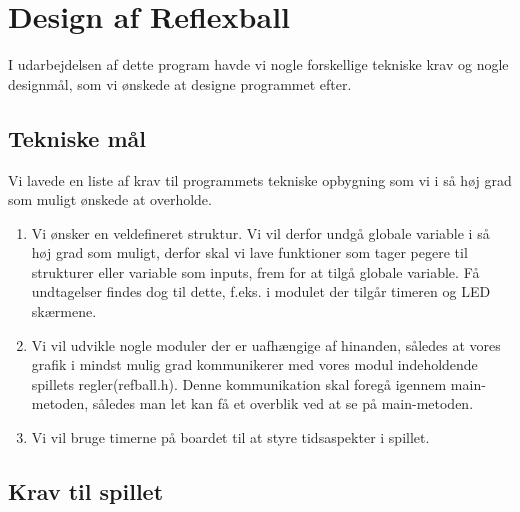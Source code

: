 \section{Design af Reflexball}
I udarbejdelsen af dette program havde vi nogle forskellige tekniske krav og nogle designmål, som vi ønskede at designe programmet efter.
\subsection{Tekniske mål}
Vi lavede en liste af krav til programmets tekniske opbygning som vi i så høj grad som muligt ønskede at overholde. 
\begin{enumerate}
\item Vi ønsker en veldefineret struktur. Vi vil derfor undgå globale variable i så høj grad som muligt, derfor skal vi lave funktioner som tager pegere til strukturer eller variable som inputs, frem for at tilgå globale variable. Få undtagelser findes dog til dette, f.eks. i modulet der tilgår timeren og LED skærmene.
\item Vi vil udvikle nogle moduler  der er uafhængige af hinanden, således at vores grafik i mindst mulig grad kommunikerer med vores modul indeholdende spillets regler(refball.h). Denne kommunikation skal foregå igennem main-metoden, således man let kan få et overblik ved at se på main-metoden.
\item Vi vil bruge timerne på boardet til at styre tidsaspekter i spillet.
	
\end{enumerate}


\subsection{Krav til spillet}
